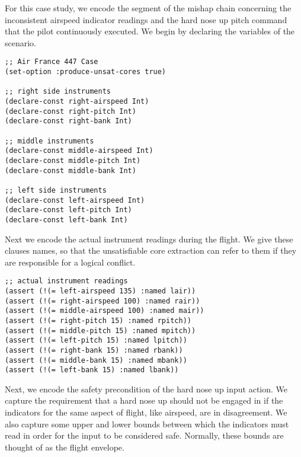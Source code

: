 For this case study, we encode the segment of the mishap chain concerning the inconsistent airspeed indicator readings and the hard nose up pitch command that the pilot continuously executed. We begin by declaring the variables of the scenario.
\noindent
\begin{tcolorbox}
\begin{lstlisting}
;; Air France 447 Case
(set-option :produce-unsat-cores true)

;; right side instruments
(declare-const right-airspeed Int)
(declare-const right-pitch Int)
(declare-const right-bank Int)

;; middle instruments
(declare-const middle-airspeed Int)
(declare-const middle-pitch Int)
(declare-const middle-bank Int)

;; left side instruments
(declare-const left-airspeed Int)
(declare-const left-pitch Int)
(declare-const left-bank Int)
\end{lstlisting}
\end{tcolorbox}
\noindent
Next we encode the actual instrument readings during the flight. We give these clauses names, so that the unsatisfiable core extraction can refer to them if they are responsible for a logical conflict.
\noindent
\begin{tcolorbox}
	\begin{lstlisting}
;; actual instrument readings
(assert (!(= left-airspeed 135) :named lair))
(assert (!(= right-airspeed 100) :named rair))
(assert (!(= middle-airspeed 100) :named mair))
(assert (!(= right-pitch 15) :named rpitch))
(assert (!(= middle-pitch 15) :named mpitch))
(assert (!(= left-pitch 15) :named lpitch))
(assert (!(= right-bank 15) :named rbank))
(assert (!(= middle-bank 15) :named mbank))
(assert (!(= left-bank 15) :named lbank))

\end{lstlisting}
\end{tcolorbox}
\noindent
Next, we encode the safety precondition of the hard nose up input action. We capture the requirement that a hard nose up should not be engaged in if the indicators for the same aspect of flight, like airspeed, are in disagreement. We also capture some upper and lower bounds between which the indicators must read in order for the input to be considered safe. Normally, these bounds are thought of as the flight envelope.

